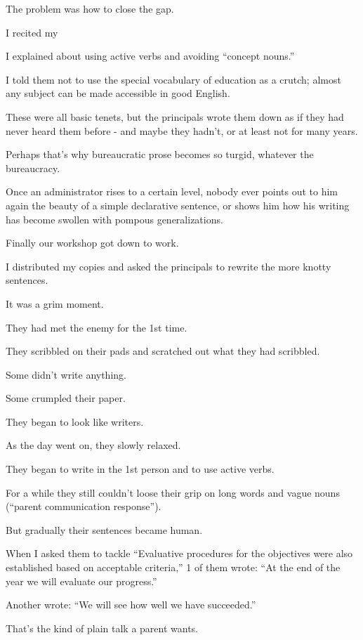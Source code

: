 \documentclass{book}
\numberwithin{equation}{section}
\begin{document}
The problem was how to close the gap.

I recited my 

I explained about using active verbs and avoiding ``concept nouns.''

I told them not to use the special vocabulary of education as a crutch; almost any subject can be made accessible in good English.

%
These were all basic tenets, but the principals wrote them down as if they had never heard them before - and maybe they hadn't, or at least not for many years.

Perhaps that's why bureaucratic prose becomes so turgid, whatever the bureaucracy.

Once an administrator rises to a certain level, nobody ever points out to him again the beauty of a simple declarative sentence, or shows him how his writing has become swollen with pompous generalizations.

%
Finally our workshop got down to work.

I distributed my copies and asked the principals to rewrite the more knotty sentences.

It was a grim moment.

They had met the enemy for the 1st time.

They scribbled on their pads and scratched out what they had scribbled.

Some didn't write anything.

Some crumpled their paper.

They began to look like writers.

%
As the day went on, they slowly relaxed.

They began to write in the 1st person and to use active verbs.

For a while they still couldn't loose their grip on long words and vague nouns (``parent communication response'').

But gradually their sentences became human.

When I asked them to tackle ``Evaluative procedures for the objectives were also established based on acceptable criteria,'' 1 of them wrote: ``At the end of the year we will evaluate our progress.''

Another wrote: ``We will see how well we have succeeded.''

%
That's the kind of plain talk a parent wants.
\end{document}

